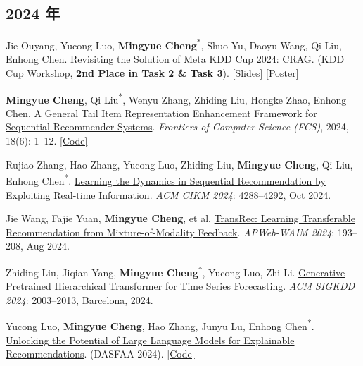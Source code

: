 \documentclass[UTF8,fontset=fandol,scheme=plain,11pt,a4paper]{ctexart}
\newcommand{\pubentry}[1]{\item \begin{minipage}[t]{\linewidth}#1\end{minipage}}
\begin{document}
\subsection{2024 年}
\begin{publist}[start=43]
\pubentry{Jie Ouyang, Yucong Luo, \textbf{Mingyue Cheng}\textsuperscript{*}, Shuo Yu, Daoyu Wang, Qi Liu, Enhong Chen. Revisiting the Solution of Meta KDD Cup 2024: CRAG. (KDD Cup Workshop, \textbf{2nd Place in Task 2 \& Task 3}). \href{https://mingyue-cheng.github.io/files/posters/KDD-slide-v4.pdf}{[Slides]} \href{https://mingyue-cheng.github.io/files/posters/crag\_kddcup.pdf}{[Poster]}}

\pubentry{\textbf{Mingyue Cheng}, Qi Liu\textsuperscript{*}, Wenyu Zhang, Zhiding Liu, Hongke Zhao, Enhong Chen. \href{https://mingyue-cheng.github.io/files/papers/tailrec-fcs2024.pdf}{A General Tail Item Representation Enhancement Framework for Sequential Recommender Systems}. \emph{Frontiers of Computer Science (FCS)}, 2024, 18(6): 1--12. \href{https://github.com/Mingyue-Cheng/TailRec}{[Code]}}

\pubentry{Rujiao Zhang, Hao Zhang, Yucong Luo, Zhiding Liu, \textbf{Mingyue Cheng}, Qi Liu, Enhong Chen\textsuperscript{*}. \href{https://dl.acm.org/doi/pdf/10.1145/3627673.3679955}{Learning the Dynamics in Sequential Recommendation by Exploiting Real-time Information}. \emph{ACM CIKM 2024}: 4288--4292, Oct 2024.}

\pubentry{Jie Wang, Fajie Yuan, \textbf{Mingyue Cheng}, et al. \href{https://arxiv.org/pdf/2206.06190.pdf}{TransRec: Learning Transferable Recommendation from Mixture-of-Modality Feedback}. \emph{APWeb-WAIM 2024}: 193--208, Aug 2024.}

\pubentry{Zhiding Liu, Jiqian Yang, \textbf{Mingyue Cheng}\textsuperscript{*}, Yucong Luo, Zhi Li. \href{https://arxiv.org/pdf/2402.16516.pdf}{Generative Pretrained Hierarchical Transformer for Time Series Forecasting}. \emph{ACM SIGKDD 2024}: 2003--2013, Barcelona, 2024.}

\pubentry{Yucong Luo, \textbf{Mingyue Cheng}, Hao Zhang, Junyu Lu, Enhong Chen\textsuperscript{*}. \href{https://arxiv.org/pdf/2312.15661}{Unlocking the Potential of Large Language Models for Explainable Recommendations}. (DASFAA 2024). \href{https://github.com/GodFire66666/LLM\_rec\_explanation}{[Code]}}


\end{publist}
\end{document}
